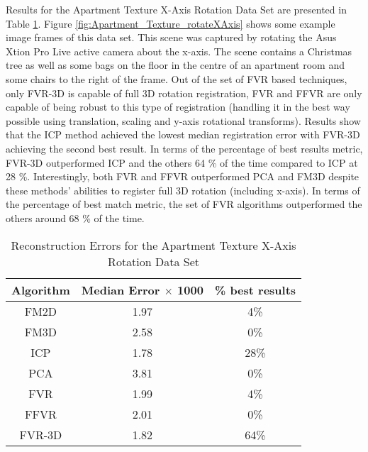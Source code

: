 Results for the Apartment Texture X-Axis Rotation Data Set are presented in Table \ref{tab:apartmenttexturex-axisrotation}. Figure \ref{fig:Apartment_Texture_rotateXAxis} shows some example image frames of this data set. This scene was captured by rotating the Asus Xtion Pro Live active camera about the x-axis. The scene contains a Christmas tree as well as some bags on the floor in the centre of an apartment room and some chairs to the right of the frame. Out of the set of FVR based techniques, only FVR-3D is capable of full 3D rotation registration, FVR and FFVR are only capable of being robust to this type of registration (handling it in the best way possible using translation, scaling and y-axis rotational transforms). Results show that the ICP method achieved the lowest median registration error with FVR-3D achieving the second best result. In terms of the percentage of best results metric, FVR-3D outperformed ICP and the others 64 \% of the time compared to ICP at 28 \%. Interestingly, both FVR and FFVR outperformed PCA and FM3D despite these methods' abilities to register full 3D rotation (including x-axis). In terms of the percentage of best match metric, the set of FVR algorithms outperformed the others around 68 \% of the time. \\

\begin{table}[t]
\centering
\caption{Reconstruction Errors for the Apartment Texture X-Axis Rotation Data Set}
\begin{tabular}{ccc}
\hline
\textbf{Algorithm} & \textbf{Median Error $\times$ 1000} & \textbf{\% best results}\\ \hline
FM2D	& 1.97 & 4\%\\
FM3D	& 2.58 & 0\%\\
ICP	& 1.78 & 28\%\\
PCA	& 3.81 & 0\%\\
FVR	& 1.99 & 4\%\\
FFVR	& 2.01 & 0\%\\
FVR-3D	& 1.82 & 64\%\\
\end{tabular}
\label{tab:apartmenttexturex-axisrotation}
\end{table} 

